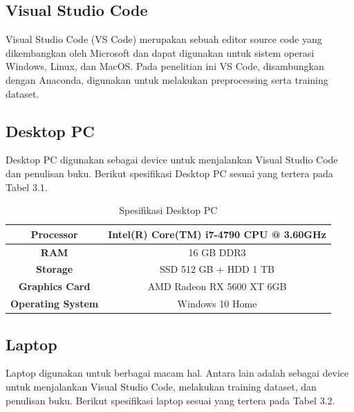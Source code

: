 \subsection{Visual Studio Code}
\label{subsec:vscode}
Visual Studio Code (VS Code) merupakan sebuah editor source code yang dikembangkan oleh Microsoft dan dapat digunakan untuk sistem operasi Windows, Linux, dan MacOS. Pada penelitian ini VS Code, disambungkan dengan Anaconda, digunakan untuk melakukan preprocessing serta training dataset.

\subsection{Desktop PC}
\label{subsec:desktop}
Desktop PC digunakan sebagai device untuk menjalankan Visual Studio Code dan penulisan buku. Berikut spesifikasi Desktop PC sesuai yang tertera pada Tabel 3.1.

\begin{table}[h]
	\centering
	
	\caption{Spesifikasi Desktop PC}
	\begin{adjustbox}{width=0.7\columnwidth, center}
	\begin{tabular}{|c|c|}
		\hline
		\textbf{Processor}        & Intel(R) Core(TM) i7-4790 CPU @ 3.60GHz \\ \hline
		\textbf{RAM}              & 16 GB DDR3                                \\ \hline
		\textbf{Storage}          & SSD 512 GB + HDD 1 TB                         \\ \hline
		\textbf{Graphics Card}    & AMD Radeon RX 5600 XT 6GB        \\ \hline
		\textbf{Operating System} & Windows 10 Home                           \\ \hline
	\end{tabular}
	\end{adjustbox}
	\label{fig:desktoptable}
\end{table}

\subsection{Laptop}
\label{subsec:laptop}

	Laptop digunakan untuk berbagai macam hal. Antara lain adalah sebagai device untuk menjalankan Visual Studio Code, melakukan training dataset, dan penulisan buku. Berikut spesifikasi laptop sesuai yang tertera pada Tabel 3.2.
	

